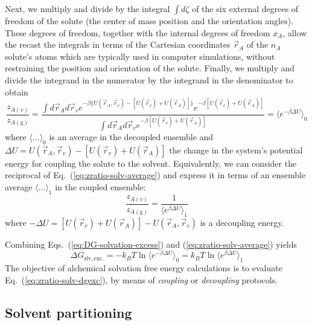 \documentclass[9pt,bestpractices]{livecoms}
\begin{document}
Next, we multiply and divide by the integral $\int d\zeta$ of the six external degrees of freedom of the solute (the center of mass position and the orientation angles). These degrees of freedom, together with the internal degrees of freedom $x_A$, allow the recast the integrals in terms of the Cartesian coordinates $\vec{r}_A$ of the $n_A$ solute's atoms which are typically used in computer simulations, without restraining the position and orientation of the solute. Finally, we multiply and divide the integrand in the numerator by the integrand in the denominator to obtain
\begin{equation}
  \frac{z_{A(v)}}{z_{A(\mathrm{g})}} =
  \frac{
    \int d\vec{r}_A  d\vec{r}_v  e^{-\beta \{ U(\vec{r}_A, \vec{r}_v) -  [ U(\vec{r}_v) + U(\vec{r}_A) ] \}} e^{-\beta [U(\vec{r}_v) + U(  \vec{r}_A  )] } 
  }{
    \int d\vec{r}_A d\vec{r}_v e^{-\beta [U(\vec{r}_v) + U( \vec{r}_A  )] } 
  } = \langle e^{-\beta \Delta U} \rangle_0
  \label{eq:zratio-solv-average}
\end{equation}
where $\langle \ldots \rangle_0$ is an average in the decoupled ensemble and $\Delta U =  U(\vec{r}_A , \vec{r}_v) -  [ U(\vec{r}_v) + U(\vec{r}_A ) ]$ the change in the system's potential energy for coupling the solute to the solvent. Equivalently, we can consider the reciprocal of Eq.~(\ref{eq:zratio-solv-average}) and express it in terms of an ensemble average $\langle \ldots \rangle_1$ in the coupled ensemble:
\begin{equation}
  \frac{z_{A(v)}}{z_{A(\mathrm{g})}} = \frac{1}{\langle e^{\beta \Delta U} \rangle_1}
\end{equation}
where $-\Delta U = [ U(\vec{r}_v) + U(\vec{r}_A ) ] - U(\vec{r}_A , \vec{r}_v)$ is a decoupling energy.

Combining Eqs.~(\ref{eq:DG-solvation-excess}) and (\ref{eq:zratio-solv-average}) yields\cite{widom1982potential} 
\begin{equation}
  \Delta G_{\mathrm{slv, exc.}} = - k_B T \ln \langle e^{-\beta \Delta U} \rangle_0 = k_B T \ln \langle e^{\beta \Delta U} \rangle_1
  \label{eq:zratio-solv-dgexc}
\end{equation}
The objective of alchemical solvation free energy calculations is to evaluate Eq.~(\ref{eq:zratio-solv-dgexc}), by means of \emph{coupling} or \emph{decoupling} protocols.
  
\subsection{Solvent partitioning}
\end{document}
